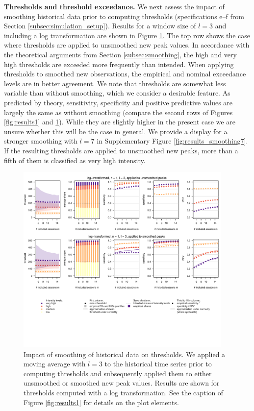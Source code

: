 \documentclass[12pt]{article}
\begin{document}
\textbf{Thresholds and threshold exceedance.} We next assess the impact of smoothing historical data prior to computing thresholds (specifications e--f from Section \ref{subsec:simulation_setup}). Results for a window size of $l = 3$ and including a log transformation are shown in Figure \ref{fig:results_smoothing}. The top row shows the case where thresholds are applied to unsmoothed new peak values. In accordance with the theoretical arguments from Section \ref{subsec:smoothing}, the high and very high thresholds are exceeded more frequently than intended. When applying thresholds to smoothed new observations, the empirical and nominal exceedance levels are in better agreement. We note that thresholds are somewhat less variable than without smoothing, which we consider a desirable feature. As predicted by theory, sensitivity, specificity and positive predictive values are largely the same as without smoothing (compare the second rows of Figures \ref{fig:results1} and \ref{fig:results_smoothing}). While they are slightly higher in the present case we are unsure whether this will be the case in general. We provide a display for a stronger smoothing with $l = 7$ in Supplementary Figure \ref{fig:results_smoothing7}. If the resulting thresholds are applied to unsmoothed new peaks, more than a fifth of them is classified as very high intensity.

\begin{figure}[h!]
\centering
\includegraphics[width=0.95\textwidth]{figure/plot_smoothing3_fr_small.pdf}

\caption{Impact of smoothing of historical data on thresholds. We applied a moving average with $l = 3$ to the historical time series prior to computing thresholds and subsequently applied them to either unsmoothed or smoothed new peak values. Results are shown for thresholds computed with a log transformation. See the caption of Figure \ref{fig:results1} for details on the plot elements.}
\label{fig:results_smoothing}
\end{figure}
\end{document}
